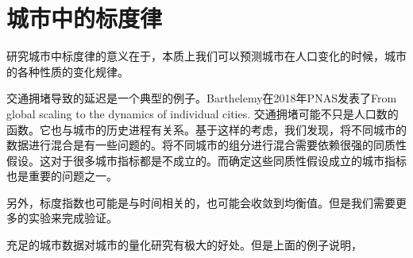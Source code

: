 \chapter{城市中的标度律}

研究城市中标度律的意义在于，本质上我们可以预测城市在人口变化的时候，城市的各种性质的变化规律。

交通拥堵导致的延迟是一个典型的例子。Barthelemy在2018年PNAS发表了From global scaling to the dynamics of individual cities. 交通拥堵可能不只是人口数的函数。它也与城市的历史进程有关系。基于这样的考虑，我们发现，将不同城市的数据进行混合是有一些问题的。将不同城市的组分进行混合需要依赖很强的同质性假设。这对于很多城市指标都是不成立的。而确定这些同质性假设成立的城市指标也是重要的问题之一。

另外，标度指数也可能是与时间相关的，也可能会收敛到均衡值。但是我们需要更多的实验来完成验证。

充足的城市数据对城市的量化研究有极大的好处。但是上面的例子说明，